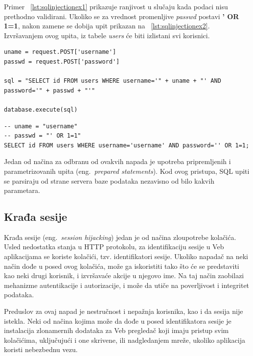 \documentclass[a4paper]{article}
\begin{document}
Primer ~\ref{lst:sqlinjectionex1} prikazuje ranjivost u slučaju kada podaci nisu prethodno validirani. Ukoliko se za vrednost promenljive \emph{passwd} postavi \textbf{' OR 1=1}, nakon zamene se dobija upit prikazan na ~\ref{lst:sqlinjectionex2}. Izvršavanjem ovog upita, iz tabele \emph{users} će biti izlistani svi korisnici.\newpage
\begin{lstlisting}[title={Primer ranjivog upita},label={lst:sqlinjectionex1}]
uname = request.POST['username']
passwd = request.POST['password']

sql = "SELECT id FROM users WHERE username='" + uname + "' AND password='" + passwd + "'"

database.execute(sql)
\end{lstlisting}
\begin{lstlisting}[title={Upit nakon zamene sa vrednošću promenljivih},label={lst:sqlinjectionex2}]
-- uname = "username"
-- passwd = "' OR 1=1"
SELECT id FROM users WHERE username='username' AND password='' OR 1=1;
\end{lstlisting}

Jedan od načina za odbranu od ovakvih napada je upotreba pripremljenih i parametrizovanih upita (eng.~{\em prepared statements}). Kod ovog pristupa, SQL upiti se parsiraju od strane servera baze podataka nezavisno od bilo kakvih parametara.

\subsection{Krađa sesije}
\label{subsec:sessionhijacking}
Krađa sesije (eng.~{\em session hijacking}) jedan je od načina zloupotrebe kolačića. Usled nedostatka stanja u HTTP protokolu, za identifikaciju sesije u Veb aplikacijama se koriste kolačići, tzv. identifikatori sesije. Ukoliko napadač na neki način dođe u posed ovog kolačića, može ga iskoristiti tako što će se predstaviti kao neki drugi korisnik, i izvršavaće akcije u njegovo ime. Na taj način zaobilazi mehanizme autentikacije i autorizacije, i može da utiče na poverljivost i integritet podataka.

Preduslov za ovaj napad je nestručnost i nepažnja korisnika, kao i da sesija nije istekla. Neki od načina kojima može da dođe u posed identifikatora sesije je instalacija zlonamernih dodataka za Veb pregledač koji imaju pristup svim kolačićima, uključujući i one skrivene, ili nadgledanjem mreže, ukoliko aplikacija koristi nebezbednu vezu.
\end{document}
